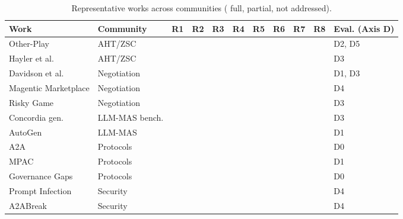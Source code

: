 \documentclass[conference]{IEEEtran}
\newcommand{\full}{{\small\CIRCLE}}
\newcommand{\half}{{\small\LEFTcircle}}
\newcommand{\none}{{\small\Circle}}
\begin{document}
\begin{table}[t]
\centering
\footnotesize
\setlength{\tabcolsep}{3pt}
\caption{Representative works across communities (\full{} full, \half{} partial, \none{} not addressed).}
\label{tab-3}
\begin{tabularx}{\textwidth}{>{\raggedright\arraybackslash}X>{\raggedright\arraybackslash}Xcccccccc>{\raggedright\arraybackslash}X}
\toprule
\textbf{Work} & \textbf{Community} & \textbf{R1} & \textbf{R2} & \textbf{R3} & \textbf{R4} & \textbf{R5} & \textbf{R6} & \textbf{R7} & \textbf{R8} & \textbf{Eval. (Axis D)} \\
\midrule
Other-Play \cite{hu2020otherplay} & AHT/ZSC & \full{} & \none{} & \none{} & \none{} & \none{} & \none{} & \none{} & \none{} & D2, D5 \\
Hayler et al. \cite{hayler2026zsc} & AHT/ZSC & \full{} & \none{} & \none{} & \none{} & \none{} & \none{} & \none{} & \none{} & D3 \\
Davidson et al. \cite{davidson2024agency} & Negotiation & \full{} & \none{} & \half{} & \none{} & \none{} & \none{} & \none{} & \none{} & D1, D3 \\
Magentic Marketplace \cite{bansal2025marketplace} & Negotiation & \half{} & \none{} & \half{} & \none{} & \none{} & \none{} & \none{} & \full{} & D4 \\
Risky Game \cite{zhu2025riskygame} & Negotiation & \full{} & \none{} & \full{} & \none{} & \half{} & \none{} & \none{} & \half{} & D3 \\
Concordia gen. \cite{smith2025concordiagen} & LLM-MAS bench. & \full{} & \none{} & \half{} & \none{} & \none{} & \none{} & \none{} & \half{} & D3 \\
AutoGen \cite{wu2023autogen} & LLM-MAS & \none{} & \none{} & \none{} & \none{} & \none{} & \half{} & \none{} & \none{} & D1 \\
A2A \cite{google2025a2a} & Protocols & \half{} & \half{} & \half{} & \none{} & \none{} & \half{} & \none{} & \none{} & D0 \\
MPAC \cite{qian2026mpac} & Protocols & \half{} & \half{} & \none{} & \half{} & \half{} & \full{} & \half{} & \half{} & D1 \\
Governance Gaps \cite{kang2026governance} & Protocols & \none{} & \none{} & \none{} & \none{} & \half{} & \half{} & \half{} & \none{} & D0 \\
Prompt Infection \cite{lee2024prompt} & Security & \none{} & \none{} & \none{} & \none{} & \none{} & \none{} & \none{} & \full{} & D4 \\
A2ABreak \cite{lotfi2026a2abreak} & Security & \none{} & \half{} & \none{} & \half{} & \none{} & \none{} & \none{} & \full{} & D4 \\

\end{tabularx}
\end{table}
\end{document}
